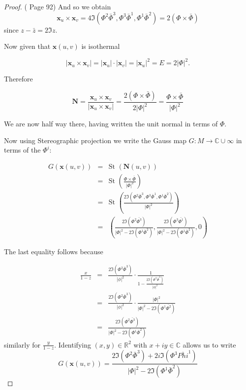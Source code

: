 \begin{proof}{(\cite{OPR} Page 92)}
And so we obtain
\begin{displaymath}
\mathbf x_u \times \mathbf x_v = 4 \Im(\Phi^2\bar{\Phi}^3,\Phi^3\bar{\Phi}^1,\Phi^1\bar{\Phi}^2) = 2(\Phi \times \bar{\Phi})
\end{displaymath}
since $z-\bar{z} = 2 \Im z$.

Now given that $\mathbf x(u,v)$ is isothermal

\begin{displaymath}
|\mathbf x_u \times \mathbf x_v| = |\mathbf x_u| \cdot |\mathbf x_v| = |\mathbf x_u|^2 = E = 2|\Phi|^2.
\end{displaymath}

Therefore

\begin{displaymath}
\mathbf N = \frac{\mathbf x_u \times \mathbf x_v}{|\mathbf x_u \times \mathbf x_v|} = \frac{2(\Phi \times \bar{\Phi})}{2|\Phi|^2} = \frac{\Phi \times \bar{\Phi}}{|\Phi|^2}
\end{displaymath}

We are now half way there, having written the unit normal in terms of $\Phi$.

Now using Stereographic projection we write the Gauss map $G:M\rightarrow \mathbb C \cup \infty$ in terms of the $\Phi^i$:

\begin{eqnarray}
\nonumber
G(\mathbf x(u,v)) &=& \mbox{St }(\mathbf N(u,v)) \\
\nonumber
&=& \mbox{St }\left(\frac{\Phi \times \bar{\Phi}}{|\Phi|^2}\right) \\
\nonumber
&=& \mbox{St }\left(\frac{2\Im(\Phi^2\bar{\Phi}^3,\Phi^3\bar{\Phi}^1,\Phi^1\bar{\Phi}^2)}{|\Phi|^2}\right) \\
\nonumber
&=& \left(\frac{2\Im(\Phi^2\bar{\Phi^3})}{|\Phi|^2-2\Im(\Phi^1\bar{\Phi}^2)}, \frac{2\Im(\Phi^3\bar{\Phi^1})}{|\Phi|^2-2\Im(\Phi^1\bar{\Phi}^2)}, 0 \right)
\end{eqnarray}

The last equality follows because

\begin{eqnarray}
\nonumber
\frac{x}{1-z} &=& \frac{2\Im(\Phi^2\bar{\Phi}^3)}{|\phi|^2}\cdot\frac{1}{1-\frac{2\Im(\Phi^2\bar{\Phi}^3)}{|\phi|^2}} \\
\nonumber
&=&\frac{2\Im(\Phi^2\bar{\Phi}^3)}{|\phi|^2}\cdot \frac{|\Phi|^2}{|\Phi|^2-2\Im(\Phi^1\bar{\Phi^2})} \\
\nonumber
&=& \frac{2\Im(\Phi^2\bar{\Phi^3})}{|\Phi|^2-2\Im(\Phi^1\bar\Phi^2)}
\end{eqnarray}
similarly for $\frac{y}{1-z}$. Identifying $(x,y) \in \mathbb R^2$ with $x+iy \in \mathbb C$ allows us to write
\begin{displaymath}
G(\mathbf x(u,v)) = \frac{2\Im(\Phi^2\bar{\Phi}^3)+2i\Im(\Phi^3\bar{Phi}^1)}{|\Phi|^2-2\Im(\Phi^1\bar{\Phi}^2)}
\end{displaymath}


\end{proof}
